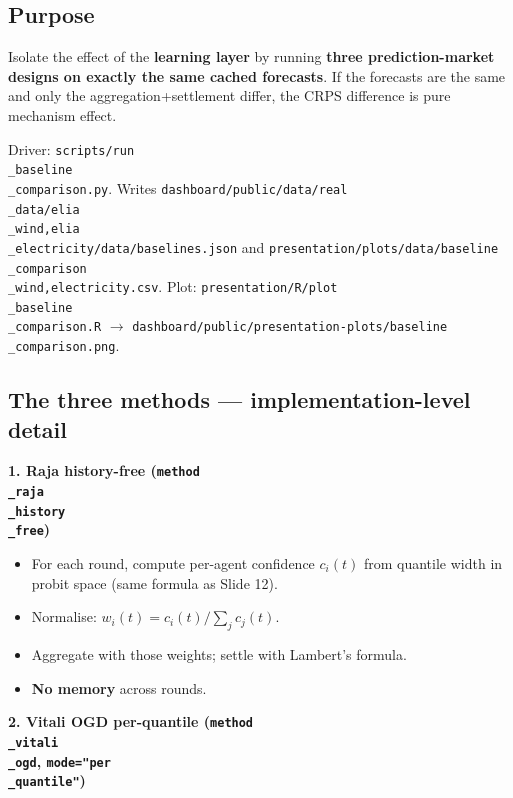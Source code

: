\documentclass[11pt]{article}
\begin{document}
\subsection{Purpose}


Isolate the effect of the \textbf{learning layer} by running \textbf{three prediction-market designs on exactly the same cached forecasts}. If the forecasts are the same and only the aggregation+settlement differ, the CRPS difference is pure mechanism effect.

Driver: \texttt{scripts/run\\_baseline\\_comparison.py}. Writes \texttt{dashboard/public/data/real\\_data/{elia\\_wind,elia\\_electricity}/data/baselines.json} and \texttt{presentation/plots/data/baseline\\_comparison\\_{wind,electricity}.csv}. Plot: \texttt{presentation/R/plot\\_baseline\\_comparison.R} $\rightarrow$ \texttt{dashboard/public/presentation-plots/baseline\\_comparison.png}.

\subsection{The three methods --- implementation-level detail}


\textbf{1. Raja history-free (\texttt{method\\_raja\\_history\\_free})}

\begin{itemize}
\item For each round, compute per-agent confidence $c_i(t)$ from quantile width in probit space (same formula as Slide 12).
\item Normalise: $w_i(t) = c_i(t) / \sum_j c_j(t)$.
\item Aggregate with those weights; settle with Lambert's formula.
\item \textbf{No memory} across rounds.
\end{itemize}

\textbf{2. Vitali OGD per-quantile (\texttt{method\\_vitali\\_ogd}, \texttt{mode="per\\_quantile"})}
\end{document}
